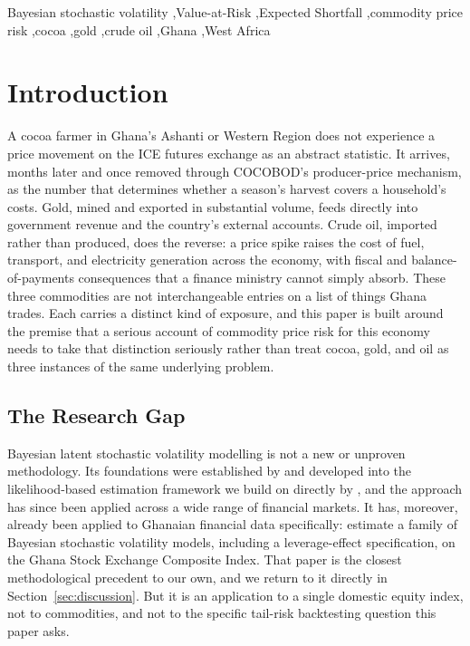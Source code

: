 \documentclass[preprint,12pt,authoryear]{elsarticle}
\begin{document}
\begin{frontmatter}
\begin{keyword}
Bayesian stochastic volatility \sep Value-at-Risk \sep Expected Shortfall \sep commodity price risk \sep cocoa \sep gold \sep crude oil \sep Ghana \sep West Africa
\end{keyword}

\end{frontmatter}

\section{Introduction}
\label{sec:introduction}

A cocoa farmer in Ghana's Ashanti or Western Region does not experience a price movement on the ICE futures exchange as an abstract statistic. It arrives, months later and once removed through COCOBOD's producer-price mechanism, as the number that determines whether a season's harvest covers a household's costs. Gold, mined and exported in substantial volume, feeds directly into government revenue and the country's external accounts. Crude oil, imported rather than produced, does the reverse: a price spike raises the cost of fuel, transport, and electricity generation across the economy, with fiscal and balance-of-payments consequences that a finance ministry cannot simply absorb. These three commodities are not interchangeable entries on a list of things Ghana trades. Each carries a distinct kind of exposure, and this paper is built around the premise that a serious account of commodity price risk for this economy needs to take that distinction seriously rather than treat cocoa, gold, and oil as three instances of the same underlying problem.

\subsection{The Research Gap}

Bayesian latent stochastic volatility modelling is not a new or unproven methodology. Its foundations were established by \citet{jacquierpolsonrossi1994} and developed into the likelihood-based estimation framework we build on directly by \citet{kimshephardchib1998}, and the approach has since been applied across a wide range of financial markets. It has, moreover, already been applied to Ghanaian financial data specifically: \citet{tweneboah2025} estimate a family of Bayesian stochastic volatility models, including a leverage-effect specification, on the Ghana Stock Exchange Composite Index. That paper is the closest methodological precedent to our own, and we return to it directly in Section~\ref{sec:discussion}. But it is an application to a single domestic equity index, not to commodities, and not to the specific tail-risk backtesting question this paper asks.
\end{document}
